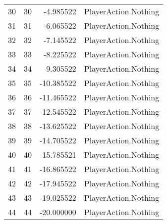 \begin{tabular}{lrrl}
30 & 30 & -4.985522 & PlayerAction.Nothing \\
31 & 31 & -6.065522 & PlayerAction.Nothing \\
32 & 32 & -7.145522 & PlayerAction.Nothing \\
33 & 33 & -8.225522 & PlayerAction.Nothing \\
34 & 34 & -9.305522 & PlayerAction.Nothing \\
35 & 35 & -10.385522 & PlayerAction.Nothing \\
36 & 36 & -11.465522 & PlayerAction.Nothing \\
37 & 37 & -12.545522 & PlayerAction.Nothing \\
38 & 38 & -13.625522 & PlayerAction.Nothing \\
39 & 39 & -14.705522 & PlayerAction.Nothing \\
40 & 40 & -15.785521 & PlayerAction.Nothing \\
41 & 41 & -16.865522 & PlayerAction.Nothing \\
42 & 42 & -17.945522 & PlayerAction.Nothing \\
43 & 43 & -19.025522 & PlayerAction.Nothing \\
44 & 44 & -20.000000 & PlayerAction.Nothing \\
\bottomrule
\end{tabular}
